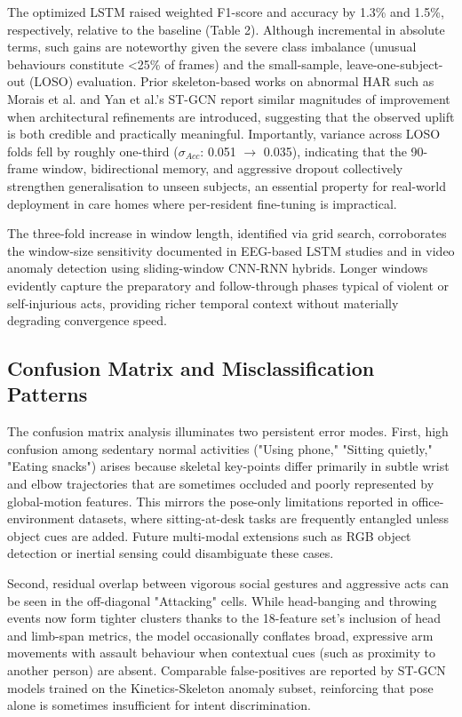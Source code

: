 \documentclass{iopconfser}
\begin{document}
The optimized LSTM raised weighted F1-score and accuracy by 1.3\% and 1.5\%, respectively, relative to the baseline (Table 2). Although incremental in absolute terms, such gains are noteworthy given the severe class imbalance (unusual behaviours constitute <25\% of frames) and the small-sample, leave-one-subject-out (LOSO) evaluation. Prior skeleton-based works on abnormal HAR such as Morais et al. \cite{morais2019learning} and Yan et al.'s ST-GCN \cite{yan2018spatial} report similar magnitudes of improvement when architectural refinements are introduced, suggesting that the observed uplift is both credible and practically meaningful. Importantly, variance across LOSO folds fell by roughly one-third ($\sigma_{Acc}$: 0.051 $\rightarrow$ 0.035), indicating that the 90-frame window, bidirectional memory, and aggressive dropout collectively strengthen generalisation to unseen subjects, an essential property for real-world deployment in care homes where per-resident fine-tuning is impractical.

The three-fold increase in window length, identified via grid search, corroborates the window-size sensitivity documented in EEG-based LSTM studies and in video anomaly detection using sliding-window CNN-RNN hybrids. Longer windows evidently capture the preparatory and follow-through phases typical of violent or self-injurious acts, providing richer temporal context without materially degrading convergence speed.

\subsection{Confusion Matrix and Misclassification Patterns}

The confusion matrix analysis illuminates two persistent error modes. First, high confusion among sedentary normal activities ("Using phone," "Sitting quietly," "Eating snacks") arises because skeletal key-points differ primarily in subtle wrist and elbow trajectories that are sometimes occluded and poorly represented by global-motion features. This mirrors the pose-only limitations reported in office-environment datasets, where sitting-at-desk tasks are frequently entangled unless object cues are added. Future multi-modal extensions such as RGB object detection or inertial sensing could disambiguate these cases.

Second, residual overlap between vigorous social gestures and aggressive acts can be seen in the off-diagonal "Attacking" cells. While head-banging and throwing events now form tighter clusters thanks to the 18-feature set's inclusion of head and limb-span metrics, the model occasionally conflates broad, expressive arm movements with assault behaviour when contextual cues (such as proximity to another person) are absent. Comparable false-positives are reported by ST-GCN models trained on the Kinetics-Skeleton anomaly subset, reinforcing that pose alone is sometimes insufficient for intent discrimination.
\end{document}
